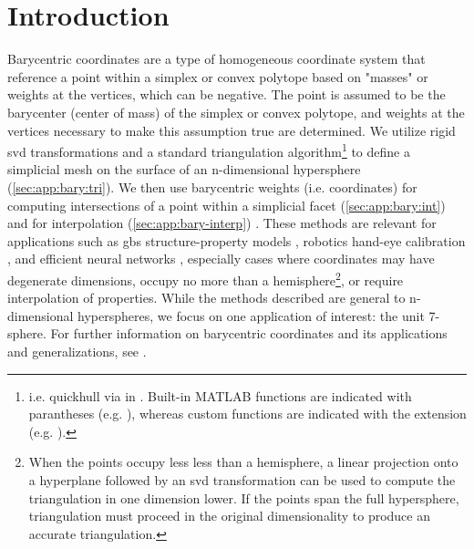 \documentclass[final,12pt]{elsarticle}
\begin{document}
\section{Introduction}
Barycentric coordinates are a type of homogeneous coordinate system that reference a \outpt{} point within a simplex \cite{langerSphericalBarycentricCoordinates2006} or convex polytope \cite{floaterGeneralizedBarycentricCoordinates2015,meyerGeneralizedBarycentricCoordinates2002,langerSphericalBarycentricCoordinates2006} based on "masses" or weights at the vertices, which can be negative. The \outpt{} point is assumed to be the barycenter (center of mass) of the simplex or convex polytope, and weights at the vertices necessary to make this assumption true are determined. We utilize rigid \gls{svd} transformations and a standard triangulation algorithm\footnote{i.e. quickhull \cite{barberQuickhullAlgorithmConvex1996} via  in . Built-in MATLAB functions are indicated with parantheses (e.g. ), whereas custom functions are indicated with the  extension (e.g. ). } to define a simplicial mesh on the surface of an n-dimensional hypersphere (\cref{sec:app:bary:tri}). We then use barycentric weights (i.e. coordinates) for computing intersections of a point within a simplicial facet (\cref{sec:app:bary:int}) and for interpolation (\cref{sec:app:bary-interp}) \cite{langerSphericalBarycentricCoordinates2006}. These methods are relevant for applications such as \glspl{gb} structure-property models \cite{chesserLearningGrainBoundary2020}, robotics hand-eye calibration \cite{wuHandEyeCalibration4D2020}, and efficient neural networks \cite{wuDeepOctonionNetworks2020}, especially cases where coordinates may have degenerate dimensions, occupy no more than a hemisphere\footnote{When the points occupy less less than a hemisphere, a linear projection onto a hyperplane followed by an \gls{svd} transformation can be used to compute the triangulation in one dimension lower. If the points span the full hypersphere, triangulation must proceed in the original dimensionality to produce an accurate triangulation. }, or require interpolation of properties. While the methods described are general to n-dimensional hyperspheres, we focus on one application of interest: the unit 7-sphere. For further information on barycentric coordinates and its applications and generalizations, see \cite{anisimovSubdividingBarycentricCoordinates2016,budninskiyPowerCoordinatesGeometric2016,dyerBarycentricCoordinateNeighbourhoods2016,floaterGeneralizedBarycentricCoordinates2015,floaterInjectivityWachspressMean2010,hormannDiscretizingWachspressKernels2017,hormannMaximumEntropyCoordinates2008,langerHigherOrderBarycentric2008,langerSphericalBarycentricCoordinates2006,leiNewCoordinateSystem2020,meyerGeneralizedBarycentricCoordinates2002,peixotoVectorFieldReconstructions2014,pihajokiBarycentricInterpolationRiemannian2019,rustamovBarycentricCoordinatesSurfaces2010,skalaRobustBarycentricCoordinates2013,taoFastNumericalSolver2019,warrenBarycentricCoordinatesConvex2007}.
\end{document}
